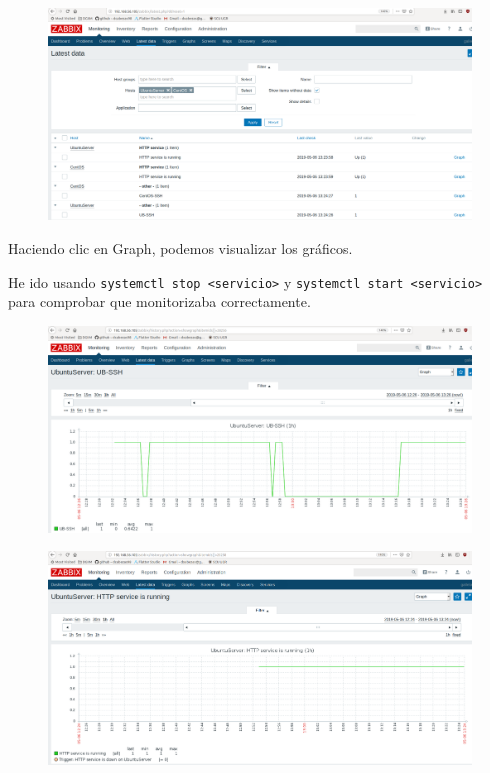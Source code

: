 \documentclass{article}
\begin{document}
\begin{figure}[H]
  \centering
  \includegraphics[width=160mm]{screenshots/latest-data}
\end{figure}

Haciendo clic en Graph, podemos visualizar los gráficos.

He ido usando \texttt{systemctl stop <servicio>} y \texttt{systemctl start <servicio>} para comprobar que monitorizaba correctamente.

\begin{figure}[H]
  \centering
  \includegraphics[width=150mm]{screenshots/graph_us-ssh}
\end{figure}

\begin{figure}[H]
  \centering
  \includegraphics[width=150mm]{screenshots/graph_us-http}
\end{figure}
\end{document}
